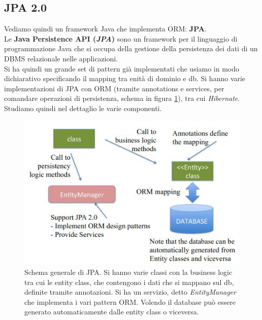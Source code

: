 \documentclass[a4paper,12pt, oneside]{book}
\begin{document}
\subsection{JPA 2.0}
Vediamo quindi un framework Java che implementa ORM: \textbf{JPA}.\\
Le \textbf{Java Persistence API (\textit{JPA})} sono un framework per il
linguaggio di programmazione Java che si occupa della gestione della persistenza
dei dati di un DBMS relazionale nelle applicazioni.\\
Si ha quindi un grande set di pattern già implementati che usiamo in modo
dichiarativo specificando il mapping tra enità di dominio e db. Si
hanno varie implementazioni di JPA con ORM (tramite annotations e services, per
comandare operazioni di persistenza, schema in figura \ref{fig:jo}), tra
cui \textit{Hibernate}. Studiamo quindi nel dettaglio le varie componenti.
\begin{figure}
  \centering
  \includegraphics[scale = 0.65]{img/jpaorm.jpg}
  \caption{Schema generale di JPA. Si hanno varie classi con la business logic
    tra cui le entity class, che contengono i dati che si mappano sul db,
    definite tramite annotazioni. Si ha
    un servizio, detto \textit{EntityManager} che implementa i vari pattern
    ORM. Volendo il database può essere generato automaticamente dalle entity
    class o viceversa.}
  \label{fig:jo}
\end{figure}
\end{document}
